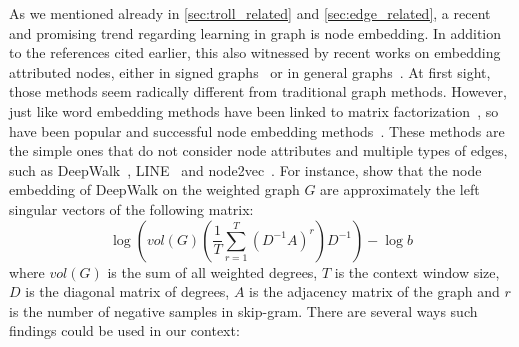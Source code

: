 As we mentioned already in \autoref{sec:troll_related} and \autoref{sec:edge_related}, a recent and
promising trend regarding learning in graph is node embedding. In addition to the references cited
earlier, this also witnessed by recent works on embedding attributed nodes, either in signed
graphs~\autocites{SignedFS17}{attributedSNE17}{SHINE18} or in general
graphs~\autocites{Liao2017}{AANE17}{DynamicEmbedding17}. At first sight, those methods seem
radically different from traditional graph methods. However, just like word embedding methods have
been linked to matrix
factorization~\autocites{WordEmbeddingAsFactorization14}{Hellinger14}{AroraRandWalk16}, so have been
popular and successful node embedding methods~\autocite{embeddingAsFactorization18}. These methods
are the simple ones that do not consider node attributes and multiple types of edges, such as
DeepWalk~\autocite{DeepWalk14}, LINE~\autocite{LINE15} and node2vec~\autocite{node2vec16}. For
instance, \textcite{embeddingAsFactorization18} show that the node embedding of DeepWalk on the
weighted graph $G$ are approximately the left singular vectors of the following matrix:
\begin{equation}
  \label{eq:deepwalk}
  \log \left( vol(G) \left( \frac{1}{T} \sum_{r=1}^T (D^{-1}A)^r\right) D^{-1} \right) - \log b
\end{equation}
where $vol(G)$ is the sum of all weighted degrees, $T$ is the context window size, $D$ is the
diagonal matrix of degrees, $A$ is the adjacency matrix of the graph and $r$ is the number of
negative samples in skip-gram. There are several ways such findings could be used in our context:
